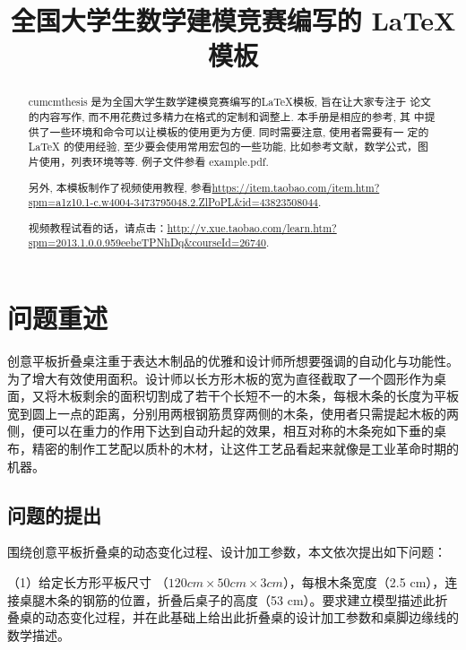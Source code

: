\documentclass{article}
\title{全国大学生数学建模竞赛编写的 \LaTeX{} 模板}
\begin{document}
    
     \maketitle
     \begin{abstract}
    cumcmthesis 是为全国大学生数学建模竞赛编写的\LaTeX{}模板, 旨在让大家专注于 论文的内容写作, 而不用花费过多精力在格式的定制和调整上. 本手册是相应的参考, 其 中提供了一些环境和命令可以让模板的使用更为方便. 同时需要注意, 使用者需要有一 定的 \LaTeX{} 的使用经验, 至少要会使用常用宏包的一些功能, 比如参考文献，数学公式，图片使用，列表环境等等. 例子文件参看 example.pdf.
    
    另外, 本模板制作了视频使用教程, 参看\url{https://item.taobao.com/item.htm?spm=a1z10.1-c.w4004-3473795048.2.ZlPoPL&id=43823508044}.
    
    视频教程试看的话，请点击：\url{http://v.xue.taobao.com/learn.htm?spm=2013.1.0.0.959eebeTPNhDq&courseId=26740}.
    
    \end{abstract}
    
    \tableofcontents
    
    \section{问题重述}
    
    创意平板折叠桌注重于表达木制品的优雅和设计师所想要强调的自动化与功能性。为了增大有效使用面积。设计师以长方形木板的宽为直径截取了一个圆形作为桌面，又将木板剩余的面积切割成了若干个长短不一的木条，每根木条的长度为平板宽到圆上一点的距离，分别用两根钢筋贯穿两侧的木条，使用者只需提起木板的两侧，便可以在重力的作用下达到自动升起的效果，相互对称的木条宛如下垂的桌布，精密的制作工艺配以质朴的木材，让这件工艺品看起来就像是工业革命时期的机器。
    
    \subsection{问题的提出}
    
    围绕创意平板折叠桌的动态变化过程、设计加工参数，本文依次提出如下问题：
    
    （1）给定长方形平板尺寸 （$120 cm \times 50 cm \times 3 cm$），每根木条宽度（2.5 cm），连接桌腿木条的钢筋的位置，折叠后桌子的高度（53 cm）。要求建立模型描述此折叠桌的动态变化过程，并在此基础上给出此折叠桌的设计加工参数和桌脚边缘线的数学描述。
    
\end{document}
